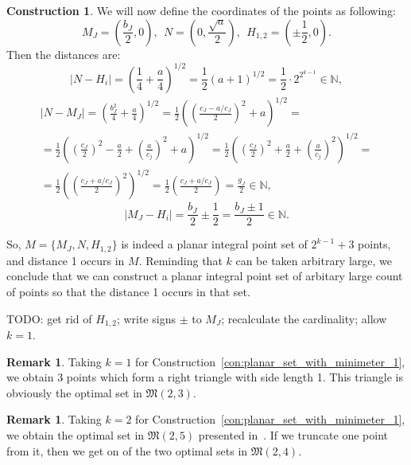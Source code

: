 \documentclass[a4paper,14pt]{article} %
\theoremstyle{plain}
\theoremstyle{definition}
\newtheorem{construction}[theorem]{Construction}
\newtheorem{remark}[theorem]{Remark}
\begin{document}
\begin{construction}
	We will now define the coordinates of the points as following:
	\begin{equation}
		M_J =\left(\frac{b_J}{2}, 0\right)
		,
		~~
		N   =\left(0, \frac{\sqrt{a}}{2}\right)
		,
		~~
		H_{1,2} = \left(\pm\frac{1}{2}, 0\right)
		.
	\end{equation}
	Then the distances are:
	\begin{equation}
		|N - H_i|
		=
		\left(\frac{1}{4} + \frac{a}{4}\right)^{1/2}
		=
		\frac{1}{2}(a + 1)^{1/2}
		=
		\frac{1}{2}\cdot 2^{2^{k-1}}
		\in\mathbb{N}
		,
	\end{equation}
	\begin{multline}
		|N - M_J|
		=
		\left(\frac{b_J^2}{4} + \frac{a}{4}\right)^{1/2}
		=
		\frac{1}{2}\left(\left(\frac{c_J - a/c_J}{2}\right)^2 + a\right)^{1/2}
		=
		\\=
		\frac{1}{2}\left( \left(\frac{c_J}{2}\right)^2 - \frac{a}{2} + \left(\frac{a}{c_j}\right)^2 + a\right)^{1/2}
		=
		\frac{1}{2}\left( \left(\frac{c_J}{2}\right)^2 + \frac{a}{2} + \left(\frac{a}{c_j}\right)^2    \right)^{1/2}
		=
		\\=
		\frac{1}{2}\left(\left(\frac{c_J + a/c_J}{2}\right)^2\right)^{1/2}
		=
		\frac{1}{2}\left(\frac{c_J + a/c_J}{2}\right)
		=
		\frac{g_J}{2}
		\in\mathbb{N}
		,
	\end{multline}
	\begin{equation}
		|M_J - H_i|
		=
		\frac{b_J}{2} \pm \frac{1}{2}
		=
		\frac{b_J \pm 1}{2}
		\in\mathbb{N}
		.
	\end{equation}


	So, $M = \{ M_J, N, H_{1,2}\}$ is indeed a planar integral point set of $2^{k-1}+3$ points,
	and distance 1 occurs in $M$.
	Reminding that $k$ can be taken arbitrary large, we conclude that we can construct
	a planar integral point set of arbitary large count of points so that the distance 1 occurs in that set.
\end{construction}


TODO: get rid of $H_{1,2}$; write signs $\pm$ to $M_J$; recalculate the cardinality; allow $k=1$.

\begin{remark}
	Taking $k=1$ for Construction~\ref{con:planar_set_with_minimeter_1},
	we obtain 3 points which form a right triangle with side length 1.
	This triangle is obviously the optimal set in $\mathfrak{M}(2,3)$.
\end{remark}

\begin{remark}
	Taking $k=2$ for Construction~\ref{con:planar_set_with_minimeter_1},
	we obtain the optimal set in $\mathfrak{M}(2,5)$ presented in~\cite[Fig. 1]{harborth1993upper}.
	If we truncate one point from it,
	then we get on of the two optimal sets in $\mathfrak{M}(2,4)$.
\end{remark}
\end{document}
